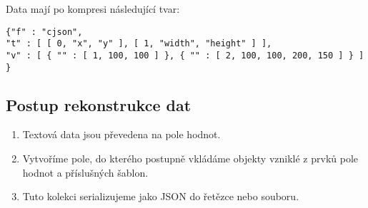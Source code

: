 Data mají po kompresi následující tvar:

\texttt{\{\hspace*{3mm}"f" : "cjson",\\
\hspace*{5mm}"t" : [ [ 0, "x", "y" ], [ 1, "width", "height" ] ],\\
\hspace*{5mm}"v" : [ \{ "" : [ 1, 100, 100 ] \}, \{ "" : [ 2, 100, 100, 200, 150 ] \} ] \}}

\subsection{Postup rekonstrukce dat}
\begin{enumerate}
\item Textová data jsou převedena na pole hodnot.
\item Vytvoříme pole, do kterého postupně vkládáme objekty vzniklé z prvků pole hodnot a příslušných šablon.
\item Tuto kolekci serializujeme jako JSON do řetězce nebo souboru.
\end{enumerate}